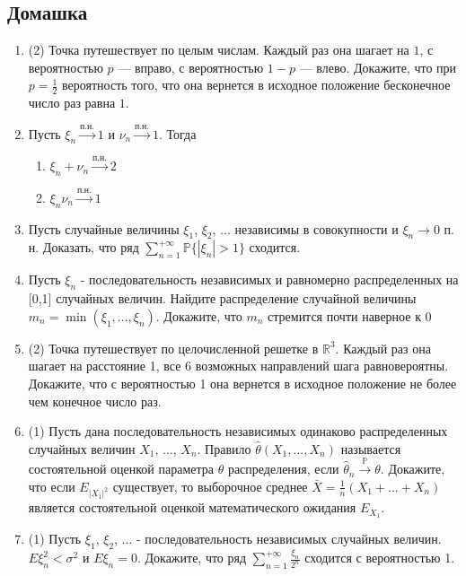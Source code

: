 \documentclass[a4paper, 14pt]{extarticle}
\begin{document}
\subsection*{Домашка}
\begin{enumerate}
\item (2) Точка путешествует по целым числам. Каждый раз она шагает на $1$, с вероятностью $p$ — вправо, с вероятностью $1-p$ — влево. 
Докажите, что при $p = \frac{1}{2}$ вероятность того, что она вернется в исходное положение бесконечное число раз равна $1$.

\item Пусть $\xi_n \overset{\textrm{п.н.}}{\to} 1$ и $\nu_n \overset{\textrm{п.н.}}{\to} 1$. 
Тогда 
\begin{enumerate}
\item $\xi_n + \nu_n \overset{\textrm{п.н.}}{\to} 2$
\item $\xi_n\nu_n \overset{\textrm{п.н.}}{\to} 1$
\end{enumerate}


\item Пусть случайные величины $\xi_1$, $\xi_2$, ... независимы в совокупности и $\xi_n \to 0$ п. н. 
Доказать, что ряд $\sum\limits_{n=1}^{+\infty} \mathbb{P}\lbrace{\left|\xi_n\right| > 1\rbrace}$ сходится.

\item Пусть $\xi_n$ - последовательность независимых и равномерно распределенных на [0,1] случайных величин. 
Найдите распределение случайной величины $m_n=\min (\xi_1,\ldots,\xi_n)$. Докажите, что $m_n$ стремится почти наверное к 0

\item (2) Точка путешествует по целочисленной решетке в $\mathbb{R}^3$. Каждый раз она шагает на расстояние 1, все 6 возможных направлений шага равновероятны. Докажите, что с вероятностью 1 она вернется в исходное положение не более чем конечное число раз.

\item (1) Пусть дана последовательность независимых одинаково распределенных случайных величин $X_1$, ..., $X_n$. Правило $\hat{\theta}(X_1, ..., X_n)$ называется состоятельной оценкой параметра $\theta$ распределения, если $\hat{\theta}_n \overset{\mathbb{P}}{\to} \theta$. Докажите, что если $E_{|X_1|^2}$ существует, то выборочное среднее $\bar{X} = \frac{1}{n}(X_1 + ... + X_n)$ является состоятельной оценкой математического ожидания $E_{X_1}$.

\item (1) Пусть $\xi_1$, $\xi_2$, ... - последовательность независимых случайных величин. $E \xi_n^2 < \sigma^2$ и $E\xi_n = 0$. Докажите, что ряд $\sum\limits_{n=1}^{+\infty}\frac{\xi_n}{2^n}$ сходится с вероятностью 1.


\end{enumerate}
\end{document}
